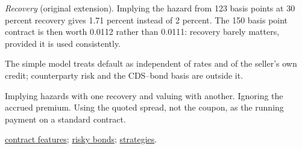 \begin{qfmethod}
\emph{Recovery} (original extension). Implying the hazard from 123 basis points at 30 percent recovery gives 1.71 percent instead of 2 percent. The 150 basis point contract is then worth 0.0112 rather than 0.0111: recovery barely matters, provided it is used consistently.

 The simple model treats default as independent of rates and of the seller's own credit; counterparty risk and the CDS--bond basis are outside it.

 Implying hazards with one recovery and valuing with another. Ignoring the accrued premium. Using the quoted spread, not the coupon, as the running payment on a standard contract.

 \hyperref[def:cds-contract-features]{contract features}; \hyperref[meth:risky-bond-cva]{risky bonds}; \hyperref[meth:cds-strategies]{strategies}.

\end{qfmethod}

